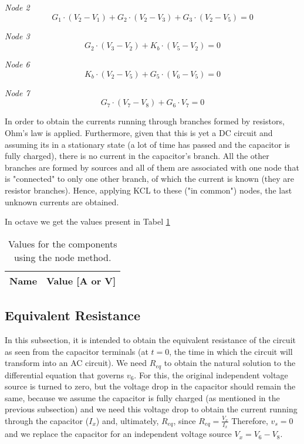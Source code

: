\textit{Node 2}
\begin{equation}
    G_1 \cdot (V_2 - V_1) + G_2 \cdot (V_2 - V_3) + G_3 \cdot(V_2 -V_5)=0
\end{equation}

\textit{Node 3}
\begin{equation}
    G_2 \cdot (V_3 - V_2) + K_b \cdot (V_5 - V_2)=0
\end{equation}

\textit{Node 6}
\begin{equation}
    K_b \cdot (V_2 - V_5) + G_5 \cdot (V_6-V_5)=0
\end{equation}

\textit{Node 7}
\begin{equation}
    G_7 \cdot(V_7 - V_8) + G_6\cdot V_7=0
\end{equation}



In order to obtain the currents running through branches formed by resistors, Ohm's law is applied. Furthermore, given that this is yet a DC circuit and assuming its in a stationary state (a lot of time has passed and the capacitor is fully charged), there is no current in the capacitor's branch. All the other branches are formed by sources and all of them are associated with one node that is "connected" to only one other branch, of which the current is known (they are resistor branches). Hence, applying KCL to these ("in common") nodes, the last unknown currents are obtained.

In octave we get the values present in Tabel \ref{tab:op}


\begin{table}[h]
  \centering
  \begin{tabular}{|l|r|}
    \hline    
    {\bf Name} & {\bf Value [A or V]} \\ \hline
    
  \end{tabular}
  \caption{Values for the components using the node method.}
  \label{tab:op}
\end{table}



\subsection{Equivalent Resistance}
\label{subsec:Req_theory}

In this subsection, it is intended to obtain the equivalent resistance of the circuit as seen from the capacitor terminals (at $t=0$, the time in which the circuit will transform into an AC circuit). We need $R_{eq}$ to obtain the natural solution to the differential equation that governs $v_6$. For this, the original independent voltage source is turned to zero, but the voltage drop in the capacitor should remain the same, because we assume the capacitor is fully charged (as mentioned in the previous subsection) and we need this voltage drop to obtain the current running through the capacitor ($I_x$) and, ultimately, $R_{eq}$, since $R_{eq} = \frac{V_x}{I_x}$ Therefore, $v_s = 0$ and we replace the capacitor for an independent voltage source $V_x = V_6 - V_8$.

